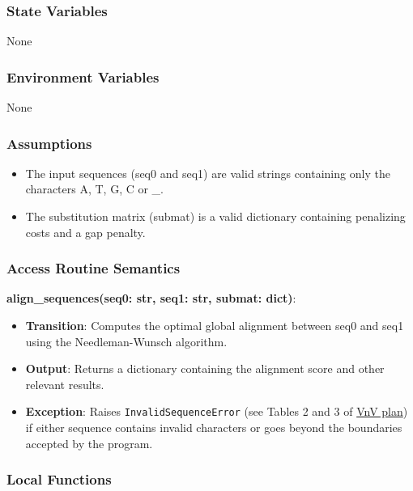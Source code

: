 \documentclass[12pt, titlepage]{article}
\begin{document}
\subsubsection{State Variables}

None

\subsubsection{Environment Variables}

None

\subsubsection{Assumptions}

\begin{itemize}
    \item The input sequences (seq0 and seq1) are valid strings containing only the characters A, T, G, C or \_.
    \item The substitution matrix (submat) is a valid dictionary containing penalizing costs and a gap penalty.
  \end{itemize}
  
\subsubsection{Access Routine Semantics}

\noindent \textbf{align\_sequences(seq0: str, seq1: str, submat: dict)}:
\begin{itemize}
    \item \textbf{Transition}: Computes the optimal global alignment between seq0 and seq1 using the Needleman-Wunsch algorithm.
    \item \textbf{Output}: Returns a dictionary containing the alignment score and other relevant results.
    \item \textbf{Exception}: Raises \texttt{InvalidSequenceError} (see Tables 2 and 3 of \href{https://github.com/UGarCil/UGarcil_capstone/blob/main/docs/VnVPlan/VnVPlan.pdf}{VnV plan}) if either sequence contains invalid characters or goes beyond the boundaries accepted by the program.
  \end{itemize}
  
  \subsubsection{Local Functions}
\end{document}
